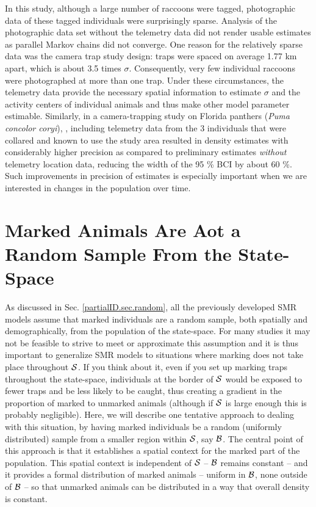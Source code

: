 In this study, although a large number of raccoons were tagged,
photographic data of these tagged individuals were surprisingly
sparse. Analysis of the photographic data set without the telemetry
data did not render usable estimates as parallel Markov chains did not
converge. One reason for the relatively sparse data was the camera
trap study design: traps were spaced on average 1.77 km apart, which
is about 3.5 times $\sigma$. Consequently, very few individual
raccoons were photographed at more than one trap. Under these
circumstances, the telemetry data provide the necessary spatial
information to estimate $\sigma$ and the activity centers of
individual animals and thus make other model parameter
estimable. Similarly, in a camera-trapping study on Florida panthers
(\emph{Puma concolor coryi}), \citet{sollmann_etal:inprepjapplecol},
including telemetry data from the 3 individuals that were collared and
known to use the study area resulted in density estimates with
considerably higher precision as compared to preliminary estimates
\emph{without} telemetry location data, reducing the width of the 95
\% BCI by about 60 \%. Such improvements in precision of estimates is
especially important when we are interested in changes in the
population over time.


\section{Marked Animals Are Aot a Random Sample From the State-Space}

As discussed in Sec. \ref{partialID.sec.random}, all the previously
developed SMR models assume that marked individuals are a random
sample, both spatially and demographically, from the population of the
state-space. For many studies it may not be feasible to strive to meet
or approximate this assumption and it is thus important to generalize
SMR models to situations where marking does not take place throughout
${\cal S}$. If you think about it, even if you set up marking traps
throughout the state-space, individuals at the border of ${\cal S}$
would be exposed to fewer traps and be less likely to be caught, thus
creating a gradient in the proportion of marked to unmarked animals
(although if ${\cal S}$ is large enough this is probably negligible).
 Here, we will describe
one tentative approach to dealing with this situation, by having marked individuals be a random (uniformly distributed) sample from a smaller region within ${\cal S}$, say ${\cal B}$.
The central point of this approach is that it establishes a spatial context for the marked part of the population. This spatial context is independent of ${\cal S}$ -- ${\cal B}$ remains constant -- and it provides a formal distribution of marked animals -- uniform in ${\cal B}$, none outside of ${\cal B}$ -- so that unmarked animals can be distributed in a way that overall density is constant.



